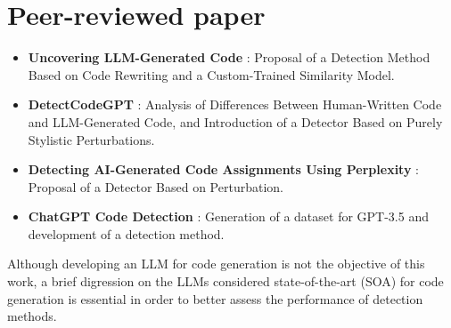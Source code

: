 \section*{Peer-reviewed paper}
\begin{itemize}
    \item \textbf{Uncovering LLM-Generated Code} \cite{ye2025uncovering}: 
    Proposal of a Detection Method Based on Code Rewriting and a Custom-Trained Similarity Model.

    \item \textbf{DetectCodeGPT} \cite{shi2024between}: 
    Analysis of Differences Between Human-Written Code and LLM-Generated Code, 
    and Introduction of a Detector Based on Purely Stylistic Perturbations.
    
    \item \textbf{Detecting AI-Generated Code Assignments Using Perplexity} \cite{xu2024detecting}: 
    Proposal of a Detector Based on Perturbation.

    \item \textbf{ChatGPT Code Detection} \cite{oedingen2024chatgpt}:
    Generation of a dataset for GPT-3.5 and development of a detection method.
    

\end{itemize}



Although developing an LLM for code generation is not the objective 
of this work, a brief digression on the LLMs considered state-of-the-art 
(SOA) for code generation is essential in order to better assess the performance 
of detection methods.